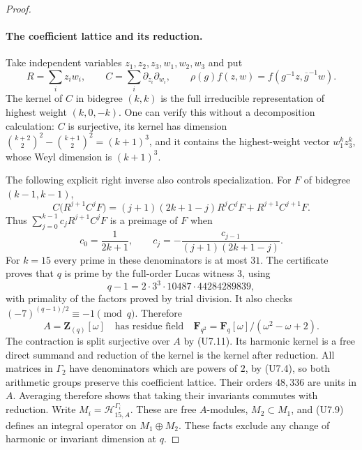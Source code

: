 \begin{proof}
\paragraph{The coefficient lattice and its reduction.}
Take independent variables $z_1,z_2,z_3,w_1,w_2,w_3$ and put
\[
 R=\sum_i z_iw_i,\qquad
 C=\sum_i\partial_{z_i}\partial_{w_i},\qquad
 \rho(g)f(z,w)=f(g^{-1}z,\overline g^{-1}w).
 \tag{U7.10}
\]
The kernel of $C$ in bidegree $(k,k)$ is the full irreducible
representation of highest weight $(k,0,-k)$. One can verify this
without a decomposition calculation: $C$ is surjective, its kernel
has dimension
$\binom{k+2}{2}^2-\binom{k+1}{2}^2=(k+1)^3$, and it contains
the highest-weight vector $w_1^kz_3^k$, whose Weyl dimension is
$(k+1)^3$.

The following explicit right inverse also controls specialization.
For $F$ of bidegree $(k-1,k-1)$,
\[
 C\bigl(R^{j+1}C^jF\bigr)
 =(j+1)(2k+1-j)R^jC^jF+R^{j+1}C^{j+1}F.
\]
Thus $\sum_{j=0}^{k-1}c_jR^{j+1}C^jF$ is a preimage of $F$ when
\[
 c_0=\frac1{2k+1},\qquad
 c_j=-\frac{c_{j-1}}{(j+1)(2k+1-j)}.
 \tag{U7.11}
\]
For $k=15$ every prime in these denominators is at most $31$.
The certificate proves that $q$ is prime by the full-order Lucas
witness $3$, using
\[
 q-1=2\cdot3^3\cdot10487\cdot44284289839,
 \tag{U7.12}
\]
with primality of the factors proved by trial division. It also
checks $(-7)^{(q-1)/2}\equiv-1\pmod q$. Therefore
\[
 A=\mathbf Z_{(q)}[\omega]
 \quad\text{has residue field}\quad
 \mathbf F_{q^2}=\mathbf F_q[\omega]/(\omega^2-\omega+2).
 \tag{U7.13}
\]
The contraction is split surjective over $A$ by (U7.11). Its
harmonic kernel is a free direct summand and reduction of the
kernel is the kernel after reduction. All matrices in $\Gamma_2$
have denominators which are powers of $2$, by (U7.4), so both
arithmetic groups preserve this coefficient lattice. Their orders
$48,336$ are units in $A$. Averaging therefore shows that taking
their invariants commutes with reduction. Write
$M_i=\mathcal H_{15,A}^{\Gamma_i}$. These are free $A$-modules,
$M_2\subset M_1$, and (U7.9) defines an integral operator on
$M_1\oplus M_2$. These facts exclude any change of harmonic or
invariant dimension at $q$.


\end{proof}
